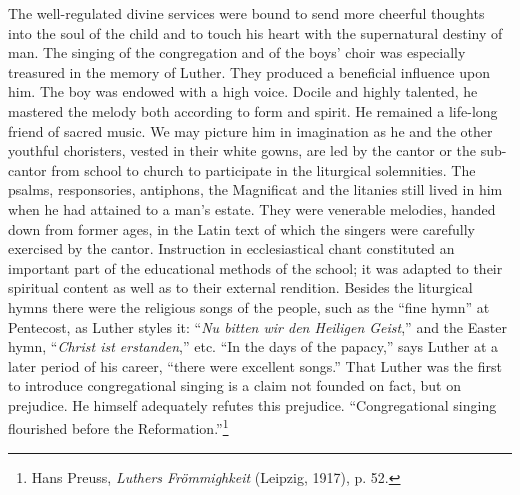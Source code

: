 The well-regulated divine services were bound to send more cheerful thoughts into the soul of the child and to touch his heart
with the supernatural destiny of man.
The singing of the congregation and of the boys’ choir was
especially treasured in the memory of Luther. They produced a
beneficial influence upon him. The boy was endowed with a high
voice. Docile and highly talented, he mastered the melody both according
to form and spirit. He remained a life-long friend of sacred
music. We may picture him in imagination as he and the other
youthful choristers, vested in their white gowns, are led by the
cantor or the sub-cantor from school to church to participate in
the liturgical solemnities. The psalms, responsories, antiphons, the
Magnificat and the litanies still lived in him when he had attained
to a man’s estate. They were venerable melodies, handed down from
former ages, in the Latin text of which the singers were carefully
exercised by the cantor. Instruction in ecclesiastical chant constituted
an important part of the educational methods of the school; it was
adapted to their spiritual content as well as to their external
rendition. Besides the liturgical hymns there were the religious songs
of the people, such as the “fine hymn” at Pentecost, as Luther styles
it: “\textit{Nu bitten wir den Heiligen Geist},” and the Easter hymn,
“\textit{Christ ist erstanden},” etc. “In the days of the papacy,” says Luther
at a later period of his career, “there were excellent songs.” That
Luther was the first to introduce congregational singing is a claim
not founded on fact, but on prejudice. He himself adequately refutes this prejudice. “Congregational singing flourished before the
Reformation.”\footnote{Hans Preuss, \textit{Luthers Frömmighkeit} (Leipzig, 1917), p. 52.}

